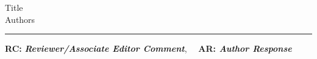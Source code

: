 \providecommand{\papertitle}{Title}
\providecommand{\authors}{Authors}
\providecommand{\journal}{Journal}
\providecommand{\doi}{--}





{\huge \papertitle}\\[1em]
{\authors}\\
\hrule

\begin{center}
{\bfseries RC:} \textbf{\textit{Reviewer/Associate Editor Comment}},\(\quad\) \bfseries AR: \textbf{\textit{Author Response}} 
\end{center}
